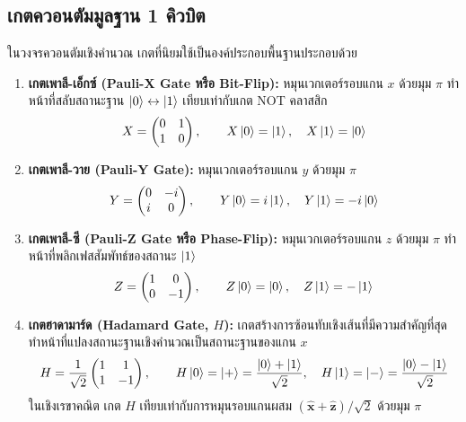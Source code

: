 \subsection{เกตควอนตัมมูลฐาน 1 คิวบิต}
ในวงจรควอนตัมเชิงคำนวณ เกตที่นิยมใช้เป็นองค์ประกอบพื้นฐานประกอบด้วย
\begin{enumerate}
    \item \textbf{เกตเพาลี-เอ็กซ์ (Pauli-X Gate หรือ Bit-Flip):} หมุนเวกเตอร์รอบแกน $x$ ด้วยมุม $\pi$ ทำหน้าที่สลับสถานะฐาน $\ket{0} \leftrightarrow \ket{1}$ เทียบเท่ากับเกต NOT คลาสสิก
    \begin{equation}
    X = \begin{pmatrix} 0 & 1 \\ 1 & 0 \end{pmatrix}, \qquad X\ket{0} = \ket{1}, \quad X\ket{1} = \ket{0}
    \end{equation}
    \item \textbf{เกตเพาลี-วาย (Pauli-Y Gate):} หมุนเวกเตอร์รอบแกน $y$ ด้วยมุม $\pi$
    \begin{equation}
    Y = \begin{pmatrix} 0 & -i \\ i & 0 \end{pmatrix}, \qquad Y\ket{0} = i\ket{1}, \quad Y\ket{1} = -i\ket{0}
    \end{equation}
    \item \textbf{เกตเพาลี-ซี (Pauli-Z Gate หรือ Phase-Flip):} หมุนเวกเตอร์รอบแกน $z$ ด้วยมุม $\pi$ ทำหน้าที่พลิกเฟสสัมพัทธ์ของสถานะ $\ket{1}$
    \begin{equation}
    Z = \begin{pmatrix} 1 & 0 \\ 0 & -1 \end{pmatrix}, \qquad Z\ket{0} = \ket{0}, \quad Z\ket{1} = -\ket{1}
    \end{equation}
    \item \textbf{เกตฮาดามาร์ด (Hadamard Gate, $H$):} เกตสร้างการซ้อนทับเชิงเส้นที่มีความสำคัญที่สุด ทำหน้าที่แปลงสถานะฐานเชิงคำนวณเป็นสถานะฐานของแกน $x$
    \begin{equation}
    H = \frac{1}{\sqrt{2}} \begin{pmatrix} 1 & 1 \\ 1 & -1 \end{pmatrix}, \qquad H\ket{0} = \ket{+} = \frac{\ket{0}+\ket{1}}{\sqrt{2}}, \quad H\ket{1} = \ket{-} = \frac{\ket{0}-\ket{1}}{\sqrt{2}}
    \end{equation}
    ในเชิงเรขาคณิต เกต $H$ เทียบเท่ากับการหมุนรอบแกนผสม $(\hat{\mathbf{x}} + \hat{\mathbf{z}})/\sqrt{2}$ ด้วยมุม $\pi$

\end{enumerate}
